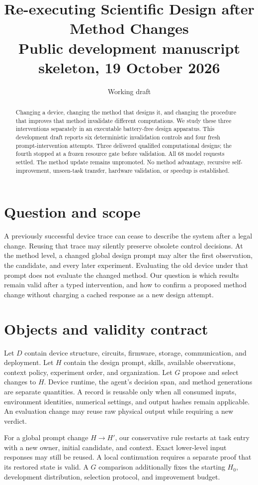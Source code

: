 \documentclass[10pt]{article}
\title{Re-executing Scientific Design after Method Changes\\\large Public development manuscript skeleton, 19 October 2026}
\author{Working draft}
\date{}
\begin{document}
\maketitle
\begin{abstract}
Changing a device, changing the method that designs it, and changing the procedure
that improves that method invalidate different computations. We study these three
interventions separately in an executable battery-free design apparatus. This
development draft reports six deterministic invalidation controls and four fresh
prompt-intervention attempts. Three delivered qualified computational designs; the
fourth stopped at a frozen resource gate before validation. All 68 model requests
settled. The method update remains unpromoted. No method advantage, recursive
self-improvement, unseen-task transfer, hardware validation, or speedup is established.
\end{abstract}

\section{Question and scope}
A previously successful device trace can cease to describe the system after a
legal change. Reusing that trace may silently preserve obsolete control decisions.
At the method level, a changed global design prompt may alter the first observation,
the candidate, and every later experiment. Evaluating the old device under that
prompt does not evaluate the changed method. Our question is which results remain
valid after a typed intervention, and how to confirm a proposed method change
without charging a cached response as a new design attempt.

\section{Objects and validity contract}
Let $D$ contain device structure, circuits, firmware, storage, communication, and
deployment. Let $H$ contain the design prompt, skills, available observations,
context policy, experiment order, and organization. Let $G$ propose and select
changes to $H$. Device runtime, the agent's decision span, and method generations
are separate quantities. A record is reusable only when all consumed inputs,
environment identities, numerical settings, and output hashes remain applicable.
An evaluation change may reuse raw physical output while requiring a new verdict.

For a global prompt change $H\to H'$, our conservative rule restarts at task entry
with a new owner, initial candidate, and context. Exact lower-level input responses
may still be reused. A local continuation requires a separate proof that its
restored state is valid. A $G$ comparison additionally fixes the starting $H_0$,
development distribution, selection protocol, and improvement budget.
\end{document}
